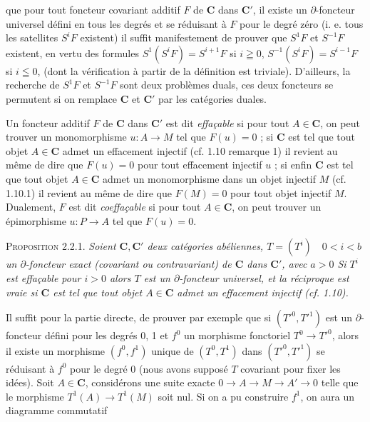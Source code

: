 
\noindent que pour tout foncteur covariant additif $F$ de $\mathbf{C}$ dans $\mathbf{C}'$, il
existe un $\partial$-foncteur universel défini en tous les degrés et se
réduisant à $F$ pour le degré zéro (i. e. tous les satellites $S^iF$
existent) il suffit manifestement de prouver que $S^1F$ et $S^{-1}F$ existent,
en vertu des formules
$S^1(S^iF)=S^{i+1}F$ si $i\geqq0$, $S^{-1}(S^iF)=S^{i-1}F$ si $i\leqq0$,
(dont la vérification à partir de la définition est triviale).
D'ailleurs, la recherche de $S^1F$ et $S^{-1}F$ sont deux problèmes duals, ces
deux foncteurs se permutent si on remplace $\mathbf{C}$ et $\mathbf{C}'$ par les catégories
duales.

Un foncteur additif $F$ de $\mathbf{C}$ dans $\mathbf{C}'$ est dit \textit{effaçable} si pour
tout $A\in \mathbf{C}$, on peut trouver un monomorphisme $u:A\to M$ tel que
$F(u)=0$ ; si $\mathbf{C}$ est tel que tout objet $A\in \mathbf{C}$ admet un effacement injectif
(cf. 1.10 remarque 1) il revient au même de dire que $F(u)=0$ pour tout
effacement injectif $u$ ; si enfin $\mathbf{C}$ est tel que tout objet $A\in \mathbf{C}$ admet
un monomorphisme dans un objet injectif $M$ (cf. 1.10.1) il revient au même de
dire que $F(M)=0$ pour tout objet injectif $M$. Dualement, $F$ est dit
\textit{coeffaçable} si pour tout $A\in \mathbf{C}$, on peut trouver un épimorphisme
$u:P\to A$ tel que $F(u)=0$.

\indent\textsc{Proposition 2.2.1.} \textit{Soient $\mathbf{C},\mathbf{C}'$ deux catégories
abéliennes, $T=(T^i)\quad 0<i<b$ un $\partial$-foncteur exact (covariant ou
contravariant) de $\mathbf{C}$ dans $\mathbf{C}'$, avec $a>0$ Si $T^i$ est effaçable pour
$i>0$ alors $T$ est un $\partial$-foncteur universel, et la réciproque est
vraie si $\mathbf{C}$ est tel que tout objet $A\in \mathbf{C}$ admet un effacement injectif
\textup{(}\textit{cf.}\textup{ 1.10)}.}

Il suffit pour la partie directe, de prouver par exemple que si
$(T'^0,T'^1)$ est un $\partial$-foncteur défini pour les degrés 0, 1 et $f^0$
un morphisme fonctoriel $T^0\to T'^0$, alors il existe un
morphisme $(f^0,f^1)$ unique de $(T^0,T^1)$ dans $(T'^0,T'^1)$ se réduisant à
$f^0$ pour le degré 0 (nous avons supposé $T$ covariant pour fixer les idées).
Soit $A\in \mathbf{C}$, considérons une suite exacte
$0\to A\to M\to A'\to 0$
telle que le morphisme $T^1(A)\to T^1(M)$ soit nul. Si on a pu
construire $f^1$, on aura un diagramme commutatif

